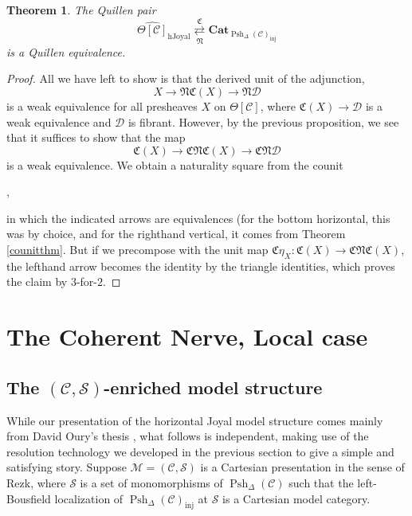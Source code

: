 \documentclass[leqno]{article}
\numberwithin{equation}{subsection}
\theoremstyle{plain}   %
\newtheorem{thm}[equation]{Theorem}
\theoremstyle{remark}
\theoremstyle{plain}
\newcommand{\Cat}{\ensuremath{\mathbf{Cat}}}
\renewcommand{\C}{\ensuremath{\mathcal{C}}}
\newcommand{\M}{\ensuremath{\mathcal{M}}}
\newcommand{\setS}{\ensuremath{\mathscr{S}}}
\newcommand{\cellset}{\ensuremath{\widehat{\Theta[\mathcal{C}]}}}
\newcommand{\spsh}{\ensuremath{\operatorname{Psh}_\Delta(\mathcal{C})}}
\begin{document}
\begin{thm}\label{mainthm1}
	The Quillen pair
	\[\cellset_{\mathrm{hJoyal}} \underset{\mathfrak{N}}{\overset{\mathfrak{C}}{\rightleftarrows}} \Cat_{\spsh_{\mathrm{inj}}}\]
	is a Quillen equivalence.
\end{thm}
\begin{proof}
	All we have left to show is that the derived unit of the adjunction,
	\[X\to \mathfrak{N}\mathfrak{C}(X) \to \mathfrak{N}\mathcal{D}\]
	is a weak equivalence for all presheaves \(X\) on \(\Theta[\C]\), where \(\mathfrak{C}(X) \to \mathcal{D}\) is a weak equivalence and \(\mathcal{D}\) is fibrant.  However, by the previous proposition, we see that it suffices to show that the map
	\[\mathfrak{C}(X)\to \mathfrak{C}\mathfrak{N}\mathfrak{C}(X) \to \mathfrak{C}\mathfrak{N}\mathcal{D}\]
	is a weak equivalence.  We obtain a naturality square from the counit
	\begin{center}
		,
	\end{center}
	in which the indicated arrows are equivalences (for the bottom horizontal, this was by choice, and for the righthand vertical, it comes from Theorem \ref{counitthm}.  But if we precompose with the unit map \(\mathfrak{C}\eta_X:\mathfrak{C}(X)\to \mathfrak{C}\mathfrak{N}\mathfrak{C}(X)\), the lefthand arrow becomes the identity by the triangle identities, which proves the claim by \(3\)-for-\(2\).
\end{proof}

\section{The Coherent Nerve, Local case}
\subsection{The \((\C,\setS)\)-enriched model structure}\label{rezkvert}
While our presentation of the horizontal Joyal model structure comes mainly from David Oury's thesis \cite{oury}, what follows is independent, making use of the resolution technology we developed in the previous section to give a simple and satisfying story. Suppose \(\M=(\C,\setS)\) is a Cartesian presentation in the sense of Rezk, where \(\setS\) is a set of monomorphisms of \(\spsh\) such that the left-Bousfield localization of \(\spsh_\mathrm{inj}\) at \(\setS\) is a Cartesian model category.  
\end{document}
